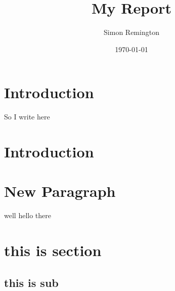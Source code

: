 \documentclass[a4paper,12pt]{article}
\begin{document}
	\pagestyle{empty}%
\title{My Report}
\author{Simon Remington}
\date{\today}
\maketitle
\newpage

\tableofcontents
\newpage

\section{Introduction}
So I write here
\section{Introduction}
\newpage
\section{New Paragraph}
well hello there
\pagebreak
\section{this is section}
\subsection{this is sub}
\end{document}
